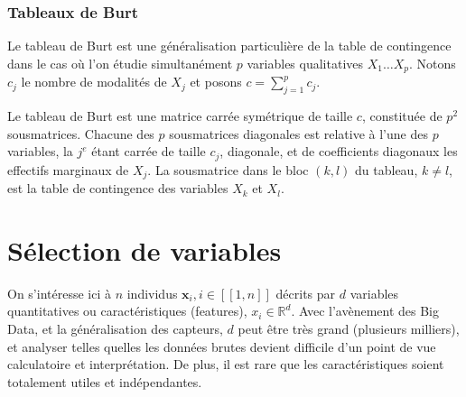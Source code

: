 \documentclass[letterpaper,10pt,english]{jupyterBook}
\begin{document}
\sphinxAtStartPar
{}


\subsection{Tableaux de Burt}
\label{\detokenize{statsdescriptives:tableaux-de-burt}}
\sphinxAtStartPar
Le tableau de Burt est une généralisation particulière de la table de contingence dans le cas où l’on étudie simultanément \(p\) variables qualitatives \(X_1\ldots X_p\). Notons \(c_j\) le nombre de modalités de \(X_j\) et posons \(c=\displaystyle\sum_{j=1}^p c_j\).

\ignorespaces 
{}\ignorespaces 
\sphinxAtStartPar
Le tableau de Burt est une matrice carrée symétrique de taille \(c\), constituée de \(p^2\) sous\sphinxhyphen{}matrices. Chacune des \(p\) sous\sphinxhyphen{}matrices diagonales est relative à l’une des \(p\) variables, la \(j^e\) étant carrée de taille \(c_j\), diagonale, et de coefficients diagonaux les effectifs marginaux de \(X_j\). La sous\sphinxhyphen{}matrice dans le bloc \((k,l)\) du tableau, \(k\neq l\), est la table de contingence des variables \(X_k\) et \(X_l\).

\sphinxstepscope


\chapter{Sélection de variables}
\label{\detokenize{selection:selection-de-variables}}\label{\detokenize{selection::doc}}
\sphinxAtStartPar
On s’intéresse ici à \(n\) individus  \(\mathbf x_i, i\in[\![1,n]\!]\) décrits par \(d\) variables quantitatives ou caractéristiques (features), \(x_i\in \mathbb{R}^d\). Avec l’avènement des Big Data, et la généralisation des capteurs, \(d\) peut être très grand (plusieurs milliers), et analyser telles quelles les données brutes devient difficile d’un point de vue calculatoire et interprétation. De plus, il est rare que les caractéristiques soient totalement utiles et indépendantes.
\end{document}
